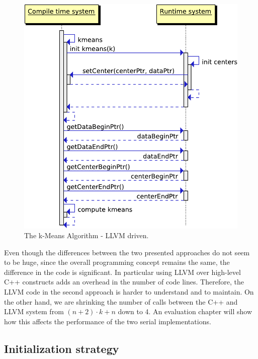 \begin{figure}[htsb]
  \centering
  \includegraphics[scale=0.4]{figures/llvm_driven}
  \caption[The k-Means Algorithm - LLVM driven]{The k-Means Algorithm - LLVM driven.}
  \label{fig:llvm_driven}
\end{figure}



Even though the differences between the two presented approaches do not seem to be huge, since the overall programming concept remains the same, the difference in the code is significant. In particular using LLVM over high-level C++ constructs adds an overhead in the number of code lines. Therefore, the LLVM code in the second approach is harder to understand and to maintain. On the other hand, we are shrinking the number of calls between the C++ and LLVM system from $(n + 2) \cdot k + n$ down to 4. An evaluation chapter will show how this affects the performance of the two serial implementations.


\subsection{Initialization strategy}

